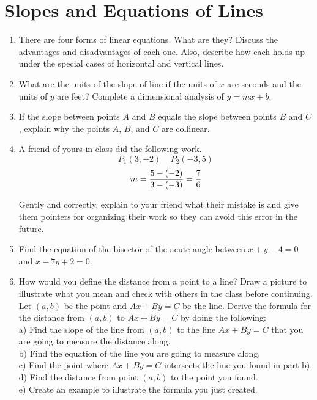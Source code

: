 \section{Slopes and Equations of Lines} 
\begin{enumerate}

\item There are four forms of linear equations.  What are they?  Discuss the advantages and disadvantages of each one.  Also, describe how each holds up under the special cases of horizontal and vertical lines.

\item What are the units of the slope of line if the units of $x$ are seconds and the units of $y$ are feet?  Complete a dimensional analysis of $y = mx + b$.  

\item If the slope between points $A$ and $B$ equals the slope between points $B$ and $C$, explain why the points $A$, $B$, and $C$ are collinear.  \cite{SM} 

\item A friend of yours in class did the following work.     
 $$P_1 \left( {3, - 2} \right)  \ \ \ \ \ P_2 \left( { - 3,5} \right)  $$ 
$$m = {{5 - ( - 2)} \over {3 - ( - 3)}} = {7 \over 6} $$
   
 Gently and correctly, explain to your friend what their mistake is and give them pointers for organizing their work so they can avoid this error in the future.

\item Find the equation of the bisector of the acute angle between $x + y - 4 = 0$ and    $x - 7y + 2 = 0$.  

\item How would you define the distance from a point to a line?  Draw a picture to illustrate what you mean and check with others in the class before continuing.  Let $(a, b)$ be the point and $Ax + By = C$ be the line.  Derive the formula for the distance from $(a, b)$ to $Ax + By = C$ by doing the following:    \\a)  Find the slope of the line from $(a, b)$ to the line $Ax + By = C$ that you are going to measure the distance along.    \\b)  Find the equation of the line you are going to measure along.    \\c)  Find the point where $Ax + By = C$ intersects the line you found in part b).    \\d)  Find the distance from point $(a, b)$ to the point you found.    \\e)  Create an example to illustrate the formula you just created.


\end{enumerate}
